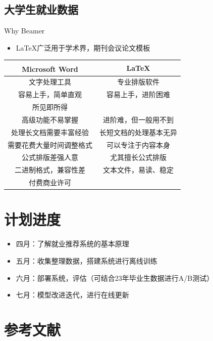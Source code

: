\documentclass{beamer}
\begin{document}
\subsection{大学生就业数据}
%
\begin{frame}{Why Beamer}
	\begin{itemize}
		\item \LaTeX 广泛用于学术界，期刊会议论文模板
	\end{itemize}
	\begin{table}[h]
		\centering
		\begin{tabular}{c|c}
			Microsoft\textsuperscript{\textregistered}  Word & \LaTeX \\
			\hline
			文字处理工具 & 专业排版软件 \\
			容易上手，简单直观 & 容易上手，进阶困难 \\
			所见即所得 & {\color{blue}{所想即所得}}  \\
			高级功能不易掌握 & 进阶难，但一般用不到 \\
			处理长文档需要丰富经验 & 长短文档的处理基本无异 \\
			需要花费大量时间调整格式 & 可以专注于内容本身 \\
			公式排版差强人意 & 尤其擅长公式排版 \\
			二进制格式，兼容性差 & 文本文件，易读、稳定 \\
			付费商业许可 & {\color{blue}{开源，自由，免费}} \\
		\end{tabular}
	\end{table}
\end{frame}

\section{计划进度}
\begin{frame}
    \begin{itemize}
        \item 四月：了解就业推荐系统的基本原理
        \item 五月：收集整理数据，搭建系统进行离线训练
        \item 六月：部署系统，评估（可结合23年毕业生数据进行A/B测试）
        \item 七月：模型改进迭代，进行在线更新
    \end{itemize}
\end{frame}

\section{参考文献}
\end{document}
